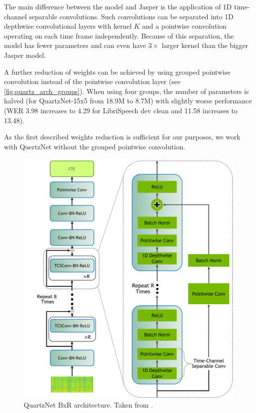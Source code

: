 The main difference between the model and Jasper is the application of 1D time-channel separable convolutions.  Such convolutions can be separated into 1D depthwise convolutional layers with kernel $K$ and a pointwise convolution operating on each time frame independently. Because of this separation, the model has fewer parameters and can even have $3 \times$ larger kernel than the bigger Jasper model.

A further reduction of weights can be achieved by using grouped pointwise convolution instead of the pointwise convolution layer (see  \cref{fig:quartz_arch_groups}). When using four groups, the number of parameters is halved (for QuartzNet-15x5 from 18.9M to 8.7M) with slightly worse performance (WER 3.98 increases to 4.29 for LibriSpeech dev clean and 11.58 increases to 13.48).

As the first described weights reduction is sufficient for our purposes, we work with QuertzNet without the grouped pointwise convolution.

\begin{figure}[t]
	\centering
	\includegraphics[width=\linewidth]{img/QuartzNet_v2.png}
	\caption{QuartzNet BxR architecture. Taken from .}
	\label{fig:quartz_arch}
\end{figure}

